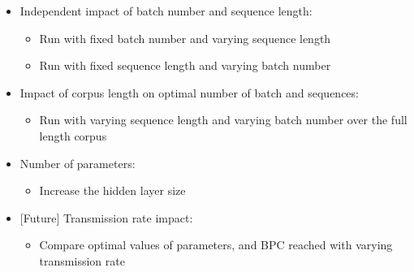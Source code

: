 \begin{itemize}
\tightlist
\item
  Independent impact of batch number and sequence length:

  \begin{itemize}
  \tightlist
  \item
    Run with fixed batch number and varying sequence length
  \item
    Run with fixed sequence length and varying batch number
  \end{itemize}
\item
  Impact of corpus length on optimal number of batch and sequences:

  \begin{itemize}
  \tightlist
  \item
    Run with varying sequence length and varying batch number over the
    full length corpus
  \end{itemize}
\item
  Number of parameters:

  \begin{itemize}
  \tightlist
  \item
    Increase the hidden layer size
  \end{itemize}
\item
  {[}Future{]} Transmission rate impact:

  \begin{itemize}
  \tightlist
  \item
    Compare optimal values of parameters, and BPC reached with varying
    transmission rate
  \end{itemize}
\end{itemize}
